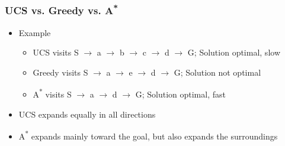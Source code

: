 \subsubsection*{UCS vs. Greedy vs. A\textsuperscript{*}}
\begin{itemize}
    \item Example
    \begin{itemize}
        \item UCS visits S $\to$ a $\to$ b $\to$ c $\to$ d $\to$ G; Solution optimal, slow
        \item Greedy visits S $\to$ a $\to$ e $\to$ d $\to$ G; Solution not optimal
        \item A\textsuperscript{*} visits S $\to$ a $\to$ d $\to$ G; Solution optimal, fast
    \end{itemize}
    \begin{figures}
    \end{figures}
    \item UCS expands equally in all directions
    \item A\textsuperscript{*} expands mainly toward the goal, but also expands the surroundings
\end{itemize}
\begin{figures}
\end{figures}

